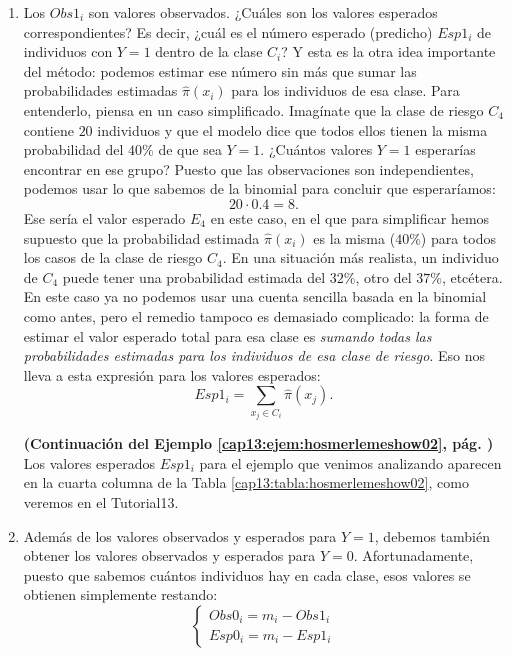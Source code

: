 \begin{enumerate}
\item Los $Obs1_i$ son valores observados. ¿Cuáles son los valores esperados correspondientes? Es decir, ¿cuál es el número esperado (predicho) $Esp1_i$ de individuos con $Y=1$ dentro de la clase $C_i$? Y esta es la otra idea importante del método: podemos estimar ese número sin más que sumar las probabilidades estimadas $\hat{\pi}(x_i)$ para los individuos de esa clase. Para entenderlo, piensa en un caso simplificado. Imagínate que la clase de riesgo $C_4$ contiene $20$ individuos y que el modelo dice que todos ellos tienen la misma probabilidad del $40\%$ de que sea $Y=1$. ¿Cuántos valores $Y=1$ esperarías encontrar en ese grupo? Puesto que las observaciones son independientes, podemos usar lo que sabemos de la binomial para concluir que esperaríamos:
    \[20 \cdot 0.4 = 8.\]
    Ese sería el valor esperado $E_4$ en este caso, en el que para simplificar hemos supuesto que la probabilidad estimada $\hat{\pi}(x_i)$ es la misma ($40\%$) para todos los casos de la clase de riesgo $C_4$. En una situación más realista, un individuo de $C_4$ puede tener una probabilidad estimada del $32\%$, otro del $37\%$, etcétera. En este caso ya no podemos usar una cuenta sencilla basada en la binomial como antes, pero el remedio tampoco es demasiado complicado: la forma de estimar el valor esperado total para esa clase es {\em sumando todas las probabilidades estimadas para los individuos de esa clase de riesgo}. Eso nos lleva a esta expresión para los valores esperados:
    \begin{equation}
    \label{cap13:ecu:Esp1HosmerLemeshow}
    Esp1_i = \displaystyle\sum_{x_j\in C_i} \hat{\pi}(x_j).
    \end{equation}
    \begin{ejemplo}
    \label{cap13:ejem:hosmerlemeshow03}
    {\bf (Continuación del Ejemplo \ref{cap13:ejem:hosmerlemeshow02}, pág. \pageref{cap13:ejem:hosmerlemeshow02})}
    Los valores esperados $Esp1_i$ para el ejemplo que venimos analizando aparecen en la cuarta columna de la Tabla \ref{cap13:tabla:hosmerlemeshow02}, como veremos en el Tutorial13.
    \end{ejemplo}


\item Además de los valores observados y esperados para $Y=1$, debemos también obtener los valores observados y esperados para $Y=0$. Afortunadamente, puesto que sabemos cuántos individuos hay en cada clase, esos valores se obtienen simplemente restando:
    \begin{equation}
    \label{cap13:ecu:ObsEsp0HosmerLemeshow}
    \begin{cases}
    Obs0_i = m_i - Obs1_i\\[3mm]
    Esp0_i = m_i - Esp1_i
    \end{cases}
    \end{equation}



\end{enumerate}
